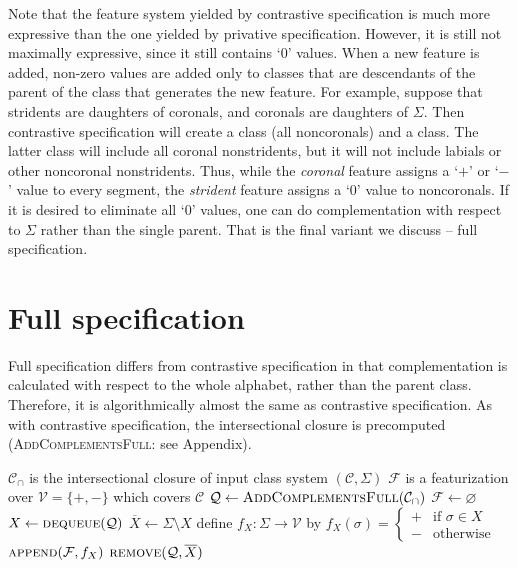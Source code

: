 \documentclass[11pt, oneside]{article}   	%
\begin{document}
\noindent Note that the feature system yielded by contrastive specification is much more expressive than the one yielded by privative specification. However, it is still not maximally expressive, since it still contains `$0$' values. When a new feature is added, non-zero values are added only to classes that are descendants of the parent of the class that generates the new feature. For example, suppose that stridents are daughters of coronals, and coronals are daughters of $\Sigma$. Then contrastive specification will create a  class (all noncoronals) and a  class. The latter class will include all coronal nonstridents, but it will not include labials or other noncoronal nonstridents. Thus, while the \textit{coronal} feature assigns a `$+$' or `$-$' value to every segment, the \textit{strident} feature assigns a `$0$' value to noncoronals. If it is desired to eliminate all `$0$' values, one can do complementation with respect to $\Sigma$ rather than the single parent. That is the final variant we discuss -- full specification.

\section{Full specification}

Full specification differs from contrastive specification in that complementation is calculated with respect to the whole alphabet, rather than the parent class. Therefore, it is algorithmically almost the same as contrastive specification. As with contrastive specification, the intersectional closure is precomputed (\textsc{AddComplementsFull}: see Appendix).

\vspace{\baselineskip} \noindent \begin{algorithmic}
    \REQUIRE $\mathcal C_\cap$ is the intersectional closure of input class system $(\mathcal C, \Sigma)$
    \ENSURE $\mathcal F$ is a featurization over $\mathcal V = \{ +, - \}$ which covers $\mathcal C$
    \STATE
    \STATE $\mathcal Q \leftarrow \textsc{AddComplementsFull}(\mathcal{C_\cap})$
    \STATE $\mathcal F \leftarrow \varnothing$
    \STATE
        \STATE $X \leftarrow \textsc{dequeue}(\mathcal Q)$
	        \STATE $\overline{X} \leftarrow \Sigma \setminus X$
            \STATE define $f_X : \Sigma \rightarrow \mathcal V$ by $f_X (\sigma) = \begin{cases}
                    + & \text{if } \sigma \in X \\
                    - & \text{otherwise}
                    \end{cases}$
            \STATE $\textsc{append}(\mathcal F, f_X)$
            \STATE $\textsc{remove}(\mathcal{Q}, \overline{X})$
        \ENDIF
    \ENDWHILE
\end{algorithmic}
\end{document}
